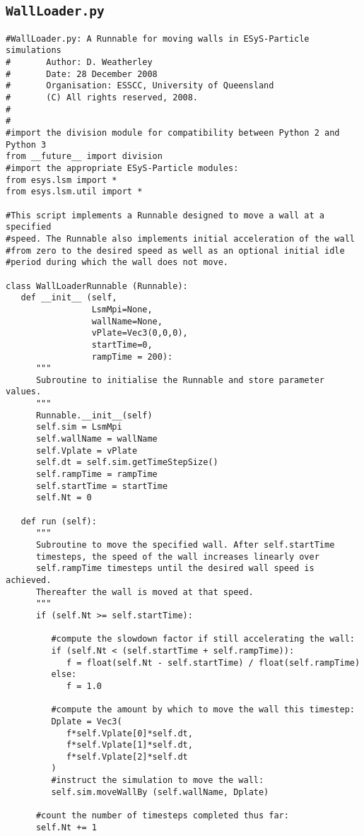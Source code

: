 \subsection{\texttt{WallLoader.py}}\label{code:WallLoader}
\begin{verbatim}
#WallLoader.py: A Runnable for moving walls in ESyS-Particle simulations
#       Author: D. Weatherley
#       Date: 28 December 2008
#       Organisation: ESSCC, University of Queensland
#       (C) All rights reserved, 2008.
#
#
#import the division module for compatibility between Python 2 and Python 3
from __future__ import division
#import the appropriate ESyS-Particle modules:
from esys.lsm import *
from esys.lsm.util import *

#This script implements a Runnable designed to move a wall at a specified
#speed. The Runnable also implements initial acceleration of the wall
#from zero to the desired speed as well as an optional initial idle
#period during which the wall does not move.

class WallLoaderRunnable (Runnable):
   def __init__ (self, 
                 LsmMpi=None, 
                 wallName=None, 
                 vPlate=Vec3(0,0,0), 
                 startTime=0, 
                 rampTime = 200):
      """
      Subroutine to initialise the Runnable and store parameter values.
      """
      Runnable.__init__(self)
      self.sim = LsmMpi
      self.wallName = wallName
      self.Vplate = vPlate
      self.dt = self.sim.getTimeStepSize()
      self.rampTime = rampTime
      self.startTime = startTime
      self.Nt = 0

   def run (self):
      """
      Subroutine to move the specified wall. After self.startTime
      timesteps, the speed of the wall increases linearly over
      self.rampTime timesteps until the desired wall speed is achieved.
      Thereafter the wall is moved at that speed.
      """
      if (self.Nt >= self.startTime):

         #compute the slowdown factor if still accelerating the wall:
         if (self.Nt < (self.startTime + self.rampTime)):
            f = float(self.Nt - self.startTime) / float(self.rampTime)
         else:
            f = 1.0

         #compute the amount by which to move the wall this timestep:
         Dplate = Vec3(
            f*self.Vplate[0]*self.dt, 
            f*self.Vplate[1]*self.dt, 
            f*self.Vplate[2]*self.dt
         )
         #instruct the simulation to move the wall:
         self.sim.moveWallBy (self.wallName, Dplate)

      #count the number of timesteps completed thus far:
      self.Nt += 1
\end{verbatim}

